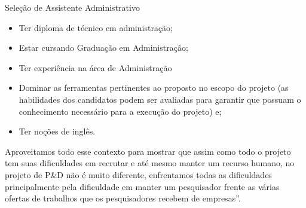 Seleção de Assistente Administrativo
\begin{itemize}
  \item Ter diploma de técnico em administração;
  \item Estar cursando Graduação em Administração;
  \item Ter experiência na área de Administração
  \item Dominar as ferramentas pertinentes ao proposto no escopo do projeto (as
habilidades dos candidatos podem ser avaliadas para garantir que possuam o
conhecimento necessário para a execução do projeto) e;
  \item Ter noções de inglês.
\end{itemize}

Aproveitamos todo esse contexto para mostrar que assim como todo o projeto tem
suas dificuldades em recrutar e até mesmo manter um recurso humano, no projeto
de P\&D não é muito diferente, enfrentamos todas as dificuldades principalmente
pela dificuldade em manter um pesquisador frente as várias ofertas de trabalhos
que os pesquisadores recebem de empresas''.

